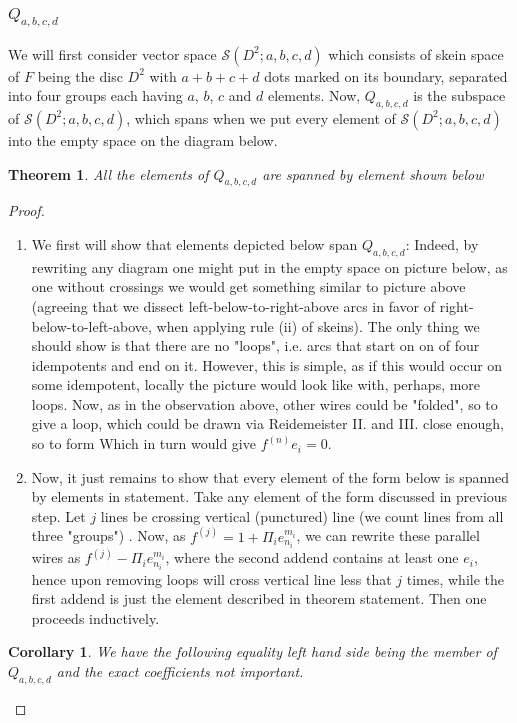 \documentclass[10pt]{article} %
\newtheorem{theorem}{Theorem}
\newtheorem{corollary}[proposition]{Corollary}
\theoremstyle{remark}
\renewcommand{\S}{\mathcal{S}}
\newcommand{\f}[1]{f^{(#1)}}
\begin{document}
\subsubsection{$Q_{a,b,c,d}$}
We will first consider vector space $\S(D^2;a,b,c,d)$ which consists of skein space of $F$ being the disc $D^2$ with $a+b+c+d$ dots marked on its
boundary, separated into four groups each having $a$, $b$, $c$ and $d$ elements. Now, $Q_{a,b,c,d}$ is the subspace of $\S(D^2;a,b,c,d)$,
which spans when we put every element of $\S(D^2;a,b,c,d)$ into the empty space on the diagram below.
\begin{theorem}
	All the elements of $Q_{a,b,c,d}$ are spanned by element shown below
\end{theorem}
\begin{proof}
	\begin{enumerate}[1$^\circ$]
		\item We first will show that elements depicted below span $Q_{a,b,c,d}$:
		Indeed, by rewriting any diagram one might put in the empty space on picture below, as one without crossings we would get
		something similar to picture above (agreeing that we dissect left-below-to-right-above arcs in favor of right-below-to-left-above,
		when applying rule (ii) of skeins). The only thing we should show is that there are no "loops", i.e. arcs that start on 
		on of four idempotents and end on it. However, this is simple, as if this would occur on some idempotent, locally the picture would
		look like
		with, perhaps, more loops. Now, as in the observation above, other wires could be "folded", so to give a loop, which could be drawn
		via Reidemeister II. and III. close enough, so to form
		Which in turn would give $\f{n}e_i=0$.
	\item Now, it just remains to show that every element of the form below is spanned by elements in statement. Take any element of the form
		discussed in previous step. Let $j$ lines be crossing vertical (punctured) line (we count lines from all three "groups")
		. Now, as $\f{j}=1+\Pi_i e_{n_i}^{m_i}$,
		we can rewrite these parallel wires as $\f{j}-\Pi_i e_{n_i}^{m_i}$, where the second addend contains at least one $e_i$, hence
		upon removing loops will cross vertical line less that $j$ times, while the first addend is just the element described in theorem
		statement. Then one proceeds inductively.
	\end{enumerate}
	\begin{corollary}\label{CombiningCorollary}
		We have the following equality
		left hand side being the member of $Q_{a,b,c,d}$ and the exact coefficients not important.
	\end{corollary}
\end{proof}
\end{document}
